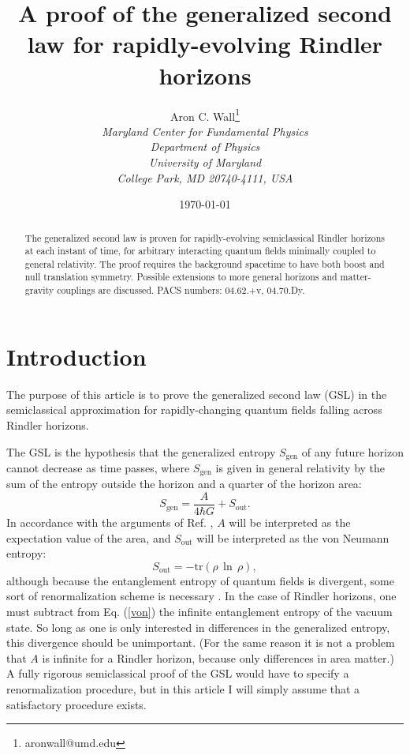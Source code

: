 \documentclass{article}
\author{Aron C. Wall\footnote{aronwall@umd.edu}
\\ \textit{Maryland Center for Fundamental Physics} \\ \textit{Department of Physics} \\ \textit{University of Maryland} \\ \textit{College Park, MD 20740-4111, USA} }
\title{A proof of the generalized second law for rapidly-evolving Rindler horizons}
\date{\today}
\begin{document}
\maketitle

\begin{abstract}
The generalized second law is proven for rapidly-evolving semiclassical Rindler horizons at each instant of time, for arbitrary interacting quantum fields minimally coupled to general relativity.  The proof requires the background spacetime to have both boost and null translation symmetry.  Possible extensions to more general horizons and matter-gravity couplings are discussed.
\newline\newline
PACS numbers: 04.62.+v, 04.70.Dy.
\end{abstract}

\section{Introduction}\label{intro}

The purpose of this article is to prove the generalized second law (GSL) in the semiclassical approximation for rapidly-changing quantum fields falling across Rindler horizons.

The GSL is the hypothesis \cite{hawking75} that the generalized entropy $S_\mathrm{gen}$ of any future horizon cannot decrease as time passes, where $S_\mathrm{gen}$ is given in general relativity by the sum of the entropy outside the horizon and a quarter of the horizon area:
\begin{equation}\label{Gen}
S_\mathrm{gen} = \frac{A}{4 \hbar G} + S_\mathrm{out}.
\end{equation}
In accordance with the arguments of Ref. \cite{10proofs}, $A$ will be interpreted as the expectation value of the area, and $S_\mathrm{out}$ will be interpreted as the von Neumann entropy:
\begin{equation}\label{von}
S_\mathrm{out} = -\mathrm{tr}(\rho\,\ln\,\rho),
\end{equation}
although because the entanglement entropy of quantum fields is divergent, some sort of renormalization scheme is necessary \cite{jacobson94}.  In the case of Rindler horizons, one must subtract from Eq. (\ref{von}) the infinite entanglement entropy of the vacuum state.  So long as one is only interested in differences in the generalized entropy, this divergence should be unimportant.  (For the same reason it is not a problem that $A$ is infinite for a Rindler horizon, because only differences in area matter.)  A fully rigorous semiclassical proof of the GSL would have to specify a renormalization procedure, but in this article I will simply assume that a satisfactory procedure exists.
\end{document}
